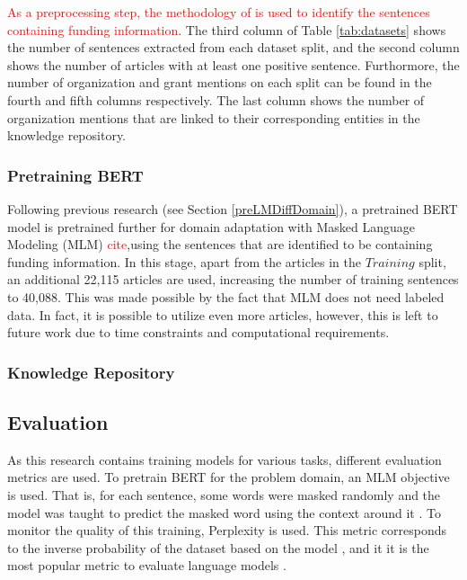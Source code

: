 \documentclass{article}
\theoremstyle{definition}
\theoremstyle{remark}
\begin{document}
\textcolor{red}{As a preprocessing step, the methodology of \cite{ElsPaper} is used to identify the sentences containing funding information}. The third column of Table \ref{tab:datasets} shows the number of sentences extracted from each dataset split, and the second column shows the number of articles with at least one positive sentence. Furthormore, the number of organization and grant mentions on each split can be found in the fourth and fifth columns respectively. The last column shows the number of organization mentions that are linked to their corresponding entities in the knowledge repository.
\subsubsection{Pretraining BERT}
\label{sec:datapretrain}
Following previous research (see Section \ref{preLMDiffDomain}), a pretrained BERT model \cite{BERT} is pretrained further for domain adaptation with Masked Language Modeling (MLM) \textcolor{red}{cite},using the sentences that are identified to be containing funding information. In this stage, apart from the articles in the $Training$ split, an additional 22,115 articles are used, increasing the number of training sentences to 40,088. This was made possible by the fact that MLM does not need labeled data. In fact, it is possible to utilize even more articles, however, this is left to future work due to time constraints and computational requirements.   

\subsubsection{Knowledge Repository}
\subsection{Evaluation}
As this research contains training models for various tasks, different evaluation metrics are used. To pretrain BERT for the problem domain, an MLM objective is used. That is, for each sentence, some words were masked randomly and the model was taught to predict the masked word using the context around it \cite{BERT}. To monitor the quality of this training, Perplexity is used. This metric corresponds to the inverse probability of the dataset based on the model \cite{perplexity}, and it it is the most popular metric to evaluate language models \cite{perplexity}. 
\end{document}
